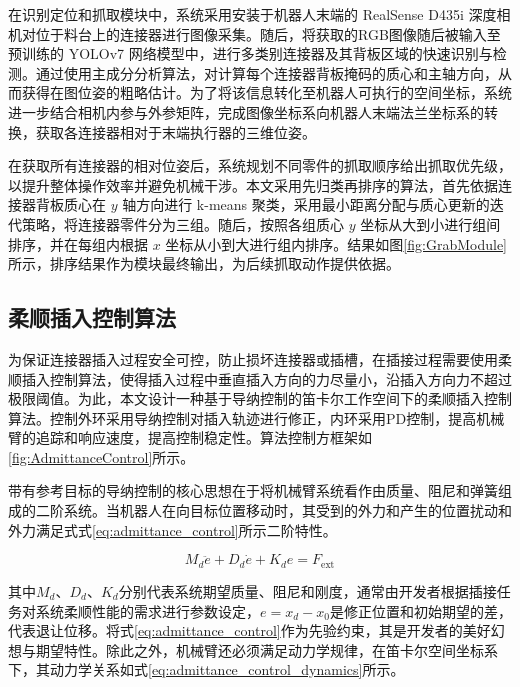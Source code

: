 \documentclass{Diploma}
\begin{document}
%

在识别定位和抓取模块中，系统采用安装于机器人末端的 RealSense D435i 深度相机对位于料台上的连接器进行图像采集。随后，将获取的RGB图像随后被输入至预训练的 YOLOv7 网络模型中，进行多类别连接器及其背板区域的快速识别与检测。通过使用主成分分析算法，对计算每个连接器背板掩码的质心和主轴方向，从而获得在图位姿的粗略估计。为了将该信息转化至机器人可执行的空间坐标，系统进一步结合相机内参与外参矩阵，完成图像坐标系向机器人末端法兰坐标系的转换，获取各连接器相对于末端执行器的三维位姿。

在获取所有连接器的相对位姿后，系统规划不同零件的抓取顺序给出抓取优先级，以提升整体操作效率并避免机械干涉。本文采用先归类再排序的算法，首先依据连接器背板质心在 $y$ 轴方向进行 k-means 聚类，采用最小距离分配与质心更新的迭代策略\cite{ikotun2023k}，将连接器零件分为三组。随后，按照各组质心 $y$ 坐标从大到小进行组间排序，并在每组内根据 $x$ 坐标从小到大进行组内排序。结果如图\ref{fig:GrabModule}所示，排序结果作为模块最终输出，为后续抓取动作提供依据。
\subsection{柔顺插入控制算法}
为保证连接器插入过程安全可控，防止损坏连接器或插槽，在插接过程需要使用柔顺插入控制算法，使得插入过程中垂直插入方向的力尽量小，沿插入方向力不超过极限阈值。为此，本文设计一种基于导纳控制\cite{calanca2015review}的笛卡尔工作空间下的柔顺插入控制算法。控制外环采用导纳控制对插入轨迹进行修正，内环采用PD控制，提高机械臂的追踪和响应速度，提高控制稳定性。算法控制方框架如\ref{fig:AdmittanceControl}所示。

%


带有参考目标的导纳控制的核心思想在于将机械臂系统看作由质量、阻尼和弹簧组成的二阶系统。当机器人在向目标位置移动时，其受到的外力和产生的位置扰动和外力满足式式\eqref{eq:admittance_control}所示二阶特性。

\begin{equation} \label{eq:admittance_control}
M_d \ddot{e} + D_d \dot{e} + K_d e = F_{\text{ext}}
\end{equation}

其中$M_d$、$D_d$、$K_d$分别代表系统期望质量、阻尼和刚度，通常由开发者根据插接任务对系统柔顺性能的需求进行参数设定，$e = x_d - x_0$是修正位置和初始期望的差，代表退让位移。将式\eqref{eq:admittance_control}作为先验约束，其是开发者的美好幻想与期望特性。除此之外，机械臂还必须满足动力学规律，在笛卡尔空间坐标系下，其动力学关系如式\eqref{eq:admittance_control_dynamics}所示。
\end{document}
